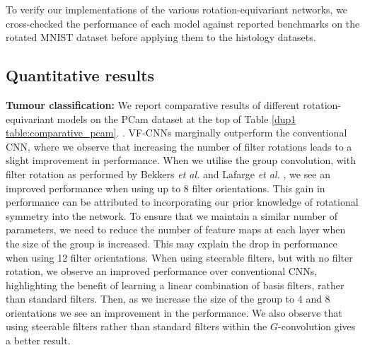 \documentclass[journal]{IEEEtran}
\newcommand\mg[1]{{\color{black}{#1}}}
\begin{document}
	    To verify our implementations of the various rotation-equivariant networks, we cross-checked the performance of each model against reported benchmarks on the rotated MNIST dataset \cite{larochelle2007empirical} before applying them to the histology datasets. \mg{These results are summarised in Table \ref{dup1 table:comparative_rotmnist}.}
	 
	    \subsection{Quantitative results} \label{dup1 section:comparison_results}
	   
	    \textbf{Tumour classification: }We report comparative results of different rotation-equivariant models on the PCam dataset at the top of Table \ref{dup1 table:comparative_pcam}. \mg{We observe that H-Nets do not perform as well as the baseline CNN for the task of tumour classification. Despite this, we observe that we are able to increase the performance when incorporating higher frequency filters in the network, but the performance is still not comparable to conventional CNNs. This may suggest that constraining the filters in this way may not be optimal for detecting complex features in histology}. VF-CNNs marginally outperform the conventional CNN, where we observe that increasing the number of filter rotations leads to a slight improvement in performance. When we utilise the group convolution, with filter rotation as performed by Bekkers \textit{et al.} \cite{bekkers2018roto} and Lafarge \textit{et al.} \cite{lafarge2020roto}, we see an improved performance when using up to 8 filter orientations. This gain in performance can be attributed to incorporating our prior knowledge of rotational symmetry into the network. To ensure that we maintain a similar number of parameters, we need to reduce the number of feature maps at each layer when the size of the group is increased. This may explain the drop in performance when using 12 filter orientations. When using steerable filters, but with no filter rotation, we observe an improved performance over conventional CNNs, highlighting the benefit of learning a linear combination of basis filters, rather than standard filters. Then, as we increase the size of the group to 4 and 8 orientations we see an improvement in the performance. We also observe that using steerable filters rather than standard filters within the $G$-convolution gives a better result. 
	    
\end{document}
